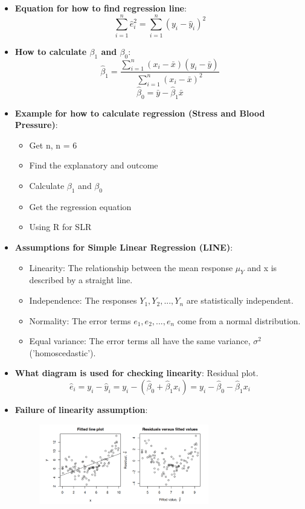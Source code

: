 \documentclass[12pt]{book}
\begin{document}
\begin{itemize}
\begin{figure}[H]
\end{figure}
\item \textbf{Equation for how to find regression line}:
$$\sum_{i=1}^{n}\hat{e}^2_i = \sum_{i=1}^{n}(y_i - \hat{y}_i )^2$$
\item \textbf{How to calculate $\beta_1$ and $\beta_0$}: 
$$\hat{\beta}_1 = \frac{\sum_{i=1}^{n}(x_i - \bar{x})(y_i - \bar{y})}{\sum_{i=1}^{n}(x_i - \bar{x})^2}$$
$$\hat{\beta}_0 = \bar{y} - \hat{\beta}_1 \bar{x}$$
\item \textbf{Example for how to calculate regression (Stress and Blood Pressure)}:
\begin{itemize}
\item Get n, n = 6
\item Find the explanatory and outcome 
\item Calculate $\beta_1$ and $\beta_0$
\item Get the regression equation
\item Using R for SLR
\end{itemize}
\item \textbf{Assumptions for Simple Linear Regression (LINE)}:
\begin{itemize}
\item Linearity: The relationship between the mean response $\mu_Y$ and x is described by a straight line.
\item Independence: The responses $Y_1,Y_2, . . . ,Y_n$ are statistically independent.
\item Normality: The error terms $e_1, e_2, . . . , e_n$ come from a normal distribution.
\item Equal variance: The error terms all have the same variance, $\sigma^2$ ('homoscedastic').
\end{itemize}
\item \textbf{What diagram is used for checking linearity}: Residual plot.
$$\hat{e}_i = y_i - \hat{y}_i = y_i - (\hat{\beta}_0 + \hat{\beta}_1 x_i) = y_i - \hat{\beta}_0 - \hat{\beta}_1 x_i$$
\item \textbf{Failure of linearity assumption}: 
\begin{figure}[H]
    \centering
    \includegraphics[width=0.7\textwidth]{2.png}

\end{figure}
\end{itemize}
\end{document}
